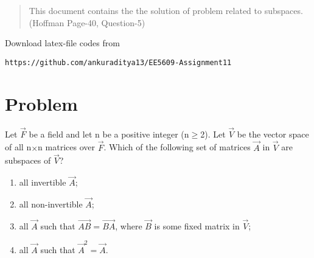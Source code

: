 \documentclass[journal,12pt,twocolumn]{IEEEtran}
\begin{document}
\begin{abstract}
This document contains the the solution of problem related to subspaces.(Hoffman Page-40, Question-5)  
\end{abstract}
Download latex-file codes from 
\begin{lstlisting}
https://github.com/ankuraditya13/EE5609-Assignment11
\end{lstlisting}

\section{Problem}
Let $\vec{F}$ be a field and let n be a positive integer (n$\geq$2). Let $\vec{V}$ be the vector space of all n$\times$n matrices over $\vec{F}$. Which of the following set of matrices $\vec{A}$ in $\vec{V}$ are subspaces of   $\vec{V}$?
\begin{enumerate}
\item all invertible $\vec{A}$;
\item all non-invertible $\vec{A}$;
\item all $\vec{A}$ such that $\vec{AB}=\vec{BA}$, where $\vec{B}$ is some fixed matrix in $\vec{V}$;
\item all $\vec{A}$ such that $\vec{A}^2 = \vec{A}$.
\end{enumerate}
\end{document}
